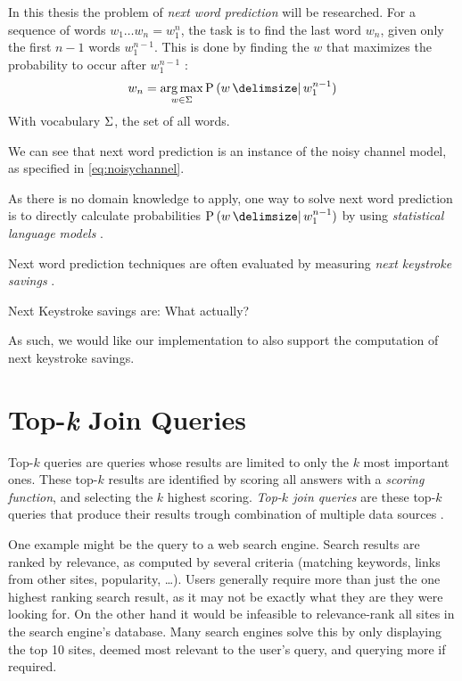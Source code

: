 In this thesis the problem of \emph{next word prediction} will be researched.
For a sequence of words $w_1 \ldots w_n = w_1^{n}$, the task is to find the last word
$w_n$, given only the first $n-1$ words $w_1^{n-1}$.
This is done by finding the $w$ that maximizes the probability to
occur after $w_1^{n-1}$ \parencite{Bickel2005}:
\begin{equation}
  \label{eq:nwp}
  w_n = \Argmax_{w \in \Vocab} \Prob{w}{w_1^{n-1}}
\end{equation}
With vocabulary $\Sigma$, the set of all words.

We can see that next word prediction is an instance of the noisy channel model,
as specified in \cref{eq:noisychannel}.

As there is no domain knowledge to apply, one way to solve next word prediction
is to directly calculate probabilities $\Prob{w}{w_1^{n-1}}$ by using
\emph{statistical language models} \parencite{Bickel2005}.

Next word prediction techniques are often evaluated by measuring \emph{next
keystroke savings} \parencite{Bickel2005}.
\begin{draft}Next Keystroke savings are: What actually?\end{draft}
As such, we would like our implementation to also support the computation of
next keystroke savings.

\section{Top-\emph{k} Join Queries}

Top-$k$ queries are queries whose results are limited to only the $k$ most
important ones.
These top-$k$ results are identified by scoring all answers with a
\emph{scoring function}, and selecting the $k$ highest scoring.
\emph{Top-$k$ join queries} are these top-$k$ queries that produce
their results trough combination of multiple data sources \parencite{Ilyas2008}.

One example might be the query to a web search engine.
Search results are ranked by relevance, as computed by several criteria
(matching keywords, links from other sites, popularity, \ldots).
Users generally require more than just the one highest ranking search result, as
it may not be exactly what they are they were looking for.
On the other hand it would be infeasible to relevance-rank all sites in the
search engine's database.
Many search engines solve this by only displaying the top 10 sites, deemed most
relevant to the user's query, and querying more if required.

